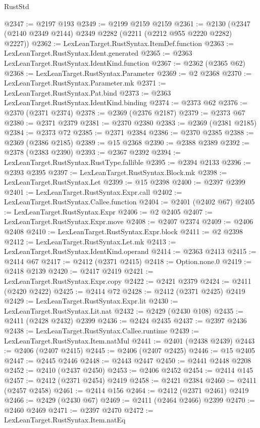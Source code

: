 \begin{lexlean}{RustStd}
\begin{coremodule}
@2347 := @2197 @193
@2349 := @2199 @2159 @2159
@2361 := @2130 (@2347 (@2140 @2349 @2144) @2349 @2282 (@2211 (@2212 @955 @2220 @2282) @2227))
@2362 := LexLeanTarget.RustSyntax.ItemDef.function
@2363 := LexLeanTarget.RustSyntax.Ident.generated
@2365 := @2363 LexLeanTarget.RustSyntax.IdentKind.function
@2367 := @2362 (@2365 @62)
@2368 := LexLeanTarget.RustSyntax.Parameter
@2369 := @2 @2368
@2370 := LexLeanTarget.RustSyntax.Parameter.mk
@2371 := LexLeanTarget.RustSyntax.Pat.bind
@2373 := @2363 LexLeanTarget.RustSyntax.IdentKind.binding
@2374 := @2373 @62
@2376 := @2370 (@2371 @2374)
@2378 := @2369 (@2376 @2187)
@2379 := @2373 @67
@2380 := @2371 @2379
@2381 := @2370 @2380
@2383 := @2369 (@2381 @2185)
@2384 := @2373 @72
@2385 := @2371 @2384
@2386 := @2370 @2385
@2388 := @2369 (@2386 @2185)
@2389 := @15 @2368
@2390 := @2388 @2389
@2392 := @2378 (@2383 @2390)
@2393 := @2367 @2392
@2394 := LexLeanTarget.RustSyntax.RustType.fallible
@2395 := @2394 @2133
@2396 := @2393 @2395
@2397 := LexLeanTarget.RustSyntax.Block.mk
@2398 := LexLeanTarget.RustSyntax.Let
@2399 := @15 @2398
@2400 := @2397 @2399
@2401 := LexLeanTarget.RustSyntax.Expr.call
@2402 := LexLeanTarget.RustSyntax.Callee.function
@2404 := @2401 (@2402 @67)
@2405 := LexLeanTarget.RustSyntax.Expr
@2406 := @2 @2405
@2407 := LexLeanTarget.RustSyntax.Expr.move
@2408 := @2407 @2374
@2409 := @2406 @2408
@2410 := LexLeanTarget.RustSyntax.Expr.block
@2411 := @2 @2398
@2412 := LexLeanTarget.RustSyntax.Let.mk
@2413 := LexLeanTarget.RustSyntax.IdentKind.operand
@2414 := @2363 @2413
@2415 := @2414 @67
@2417 := @2412 (@2371 @2415)
@2418 := Option.none.{0}
@2419 := @2418 @2139
@2420 := @2417 @2419
@2421 := LexLeanTarget.RustSyntax.Expr.copy
@2422 := @2421 @2379
@2424 := @2411 (@2420 @2422)
@2425 := @2414 @72
@2428 := @2412 (@2371 @2425) @2419
@2429 := LexLeanTarget.RustSyntax.Expr.lit
@2430 := LexLeanTarget.RustSyntax.Lit.nat
@2432 := @2429 (@2430 @108)
@2435 := @2411 (@2428 @2432) @2399
@2436 := @2424 @2435
@2437 := @2397 @2436
@2438 := LexLeanTarget.RustSyntax.Callee.runtime
@2439 := LexLeanTarget.RustSyntax.Item.natMul
@2441 := @2401 (@2438 @2439)
@2443 := @2406 (@2407 @2415)
@2445 := @2406 (@2407 @2425)
@2446 := @15 @2405
@2447 := @2445 @2446
@2448 := @2443 @2447
@2450 := @2441 @2448 @2208
@2452 := @2410 (@2437 @2450)
@2453 := @2406 @2452
@2454 := @2414 @145
@2457 := @2412 (@2371 @2454) @2419
@2458 := @2421 @2384
@2460 := @2411 (@2457 @2458)
@2461 := @2414 @156
@2464 := @2412 (@2371 @2461) @2419
@2466 := @2429 (@2430 @67)
@2469 := @2411 (@2464 @2466) @2399
@2470 := @2460 @2469
@2471 := @2397 @2470
@2472 := LexLeanTarget.RustSyntax.Item.natEq

\end{coremodule}
\end{lexlean}
